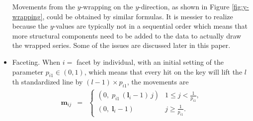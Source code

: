 \documentclass[12pt]{article}
\begin{document}
\begin{itemize}
Movements from the $y$-wrapping on the $y$-direction,
as shown in Figure \ref{fig:y-wrapping}, could be obtained
by similar formulas. It is messier to realize because the
$y$-values are typically not in a sequential order which
means that more structural components need to be added to
the data to actually draw the wrapped series. Some of the
issues are discussed later in this paper.




\item Faceting. When $i=$ facet by individual, with an initial setting of the
parameter $p_{i1}\in (0,1)$, which means that every hit on the
key will lift the $l$th standardized line by $(l-1)\times p_{i1}$,
the movements are
\begin{eqnarray*}
\mathbf{m}{}_{ij} & = & \begin{cases}
 (0,\; p_{i1}\, (\mathbf{l}{}_i-1)\, j) & 1\leq j<\frac{1}{p_{i1}},\\
 (0,\; \mathbf{l}{}_i-1) & j\ge\frac{1}{p_{i1}}.
\end{cases}
\end{eqnarray*}


\end{itemize}
\end{document}

